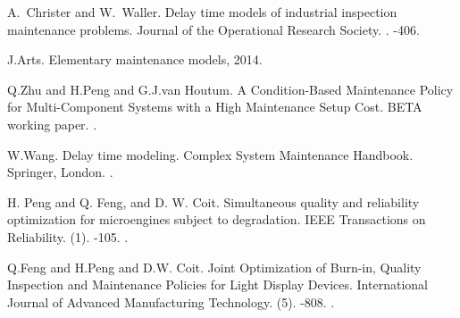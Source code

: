 \begin{thebibliography}{1}

A.~Christer and W.~Waller.
\newblock Delay time models of industrial inspection maintenance problems.
\newblock Journal of the Operational Research Society.
.
-406.

J.Arts.
\newblock Elementary maintenance models, 2014.

Q.Zhu and H.Peng and G.J.van Houtum.
\newblock A Condition-Based Maintenance Policy for Multi-Component Systems with a High Maintenance Setup Cost.
\newblock BETA working paper.
.

W.Wang.
\newblock Delay time modeling.
\newblock Complex System Maintenance Handbook.
\newblock Springer, London.
.

H. Peng and Q. Feng, and D. W. Coit.
\newblock Simultaneous quality and reliability optimization for microengines subject to degradation.
\newblock IEEE Transactions on Reliability.
(1).
-105.
.

Q.Feng and H.Peng and D.W. Coit.
\newblock Joint Optimization of Burn-in, Quality Inspection and Maintenance Policies for Light Display Devices.
\newblock International Journal of Advanced Manufacturing Technology.
(5).
-808.
.


\end{thebibliography}
